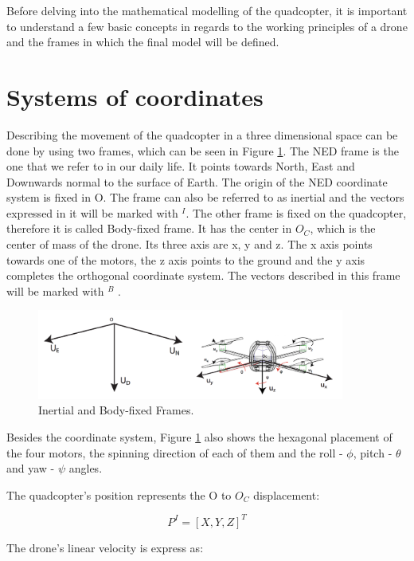Before delving into the mathematical modelling of the quadcopter, it is important to understand a few basic concepts in regards to the working principles of a drone and the frames in which the final model will be defined.

\section{Systems of coordinates} \label{2.1} 
Describing the movement of the quadcopter in a three dimensional space can be done by using two frames, which can be seen in Figure \ref{frames1}. The NED frame is the one that we refer to in our daily life. It points towards North, East and Downwards normal to the surface of Earth. The origin of the NED coordinate system is fixed in O. The frame can also be referred to as inertial and the vectors expressed in it will be marked with $^{I}$. The other frame is fixed on the quadcopter, therefore it is called Body-fixed frame. It has the center in $O_{C}$, which is the center of mass of the drone. Its three axis are x, y and z. The x axis points towards one of the motors, the z axis points to the ground and the y axis completes the orthogonal coordinate system. The vectors described in this frame will be marked with $^{B}$ \cite{Report1} \cite{Report2} .

\begin{figure}[H]
  \centering
    \includegraphics[width=0.9\textwidth]{images/frames1.png}
	\caption{Inertial and Body-fixed Frames\cite{Report1}.}
	\label{frames1}
\end{figure}

Besides the coordinate system, Figure \ref{frames1} also shows the hexagonal placement of the four motors, the spinning direction of each of them and the roll - $\phi$, pitch - $\theta$ and yaw - $\psi$ angles. 

The quadcopter's position represents the O to $O_{C}$ displacement:

\begin{equation}
	P^{I}=[X, Y, Z] ^{T}
\end{equation} 

The drone's linear velocity is express as:

